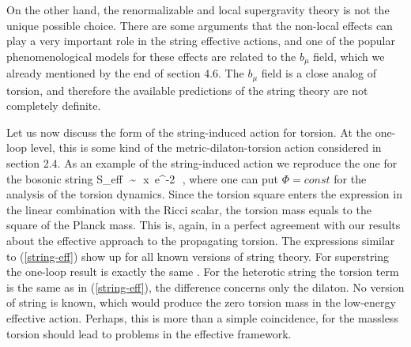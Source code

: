 On the other hand, the 
renormalizable and local supergravity theory is not the
unique possible choice. There are some arguments \cite{coll+kost}
that the non-local effects can play a very important role
in the string effective actions, and one of the 
popular phenomenological models for these effects are
related to the $b_\mu$ field, 
which we already mentioned by the end of section 4.6.
The $b_\mu$ field is a close analog of torsion, and therefore
the available predictions of the string theory are not 
completely definite. 
 
Let us now discuss the form of the string-induced action for 
torsion. At the one-loop level, this is some kind of the 
metric-dilaton-torsion action considered in section 2.4.
As an example of the string-induced action we 
reproduce the one for the bosonic string
\beq
S_{eff}\,\, \sim\,\,  x  \,e^{-2\Phi}
\,\,,
\label{string-eff}
\eeq
where one can put $\Phi=const$ for the analysis of the 
torsion dynamics.
Since the torsion square enters the expression 
in the linear combination with the Ricci scalar,
the torsion mass equals to the square of the Planck 
mass. This is, again, in a perfect agreement with 
our results about the effective approach to the
propagating torsion. The expressions 
similar to (\ref{string-eff}) show up for all known 
versions of string theory. For superstring the one-loop
result is exactly the same \cite{zach}. For the heterotic
string the torsion term is the same as in (\ref{string-eff}), 
the difference concerns only the dilaton. No version of string 
is known, which would produce the zero torsion mass in the 
low-energy effective action. Perhaps, this is more than a 
simple coincidence, for the massless torsion should lead 
to  problems in the effective framework.

